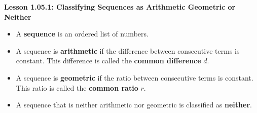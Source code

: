 \begin{center}
\textbf{Lesson 1.05.1: Classifying Sequences as Arithmetic Geometric or Neither}
\end{center}

\vspace*{-1.5ex}

\begin{itemize}
    \item A \textbf{sequence} is an ordered list of numbers.
    \item A sequence is \textbf{arithmetic} if the difference between consecutive terms is constant. This difference is called the \textbf{common difference} \( d \).
    \item A sequence is \textbf{geometric} if the ratio between consecutive terms is constant. This ratio is called the \textbf{common ratio} \( r \).
    \item A sequence that is neither arithmetic nor geometric is classified as \textbf{neither}.
\end{itemize}

